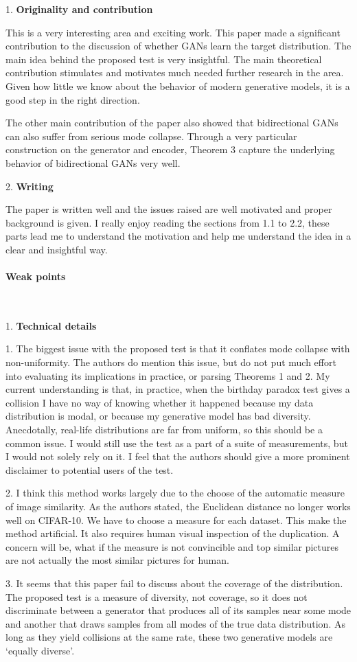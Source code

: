 \documentclass{article}
\begin{document}
1. \textbf{Originality and contribution} 

This is a very interesting area and exciting work. This paper made a significant contribution to the discussion of whether GANs learn the target distribution. The main idea behind the proposed test is very insightful. The main theoretical contribution stimulates and motivates much needed further research in the area. Given how little we know about the behavior of modern generative models, it is a good step in the right direction. 

The other main contribution of the paper also showed that bidirectional GANs can also suffer from serious mode collapse. 
Through a very particular construction on the generator and encoder, Theorem 3 capture the underlying behavior of bidirectional GANs very well.

2. \textbf{Writing} \

The paper is written well and the issues raised are well motivated and proper background is given. I really enjoy reading the sections from 1.1 to 2.2, these parts lead me to understand the motivation and help me understand the idea in a clear and insightful way.

\paragraph{Weak points}  \ 

1. \textbf{Technical details} 

1. The biggest issue with the proposed test is that it conflates mode collapse with non-uniformity. The authors do mention this issue, but do not put much effort into evaluating its implications in practice, or parsing Theorems 1 and 2. My current understanding is that, in practice, when the birthday paradox test gives a collision I have no way of knowing whether it happened because my data distribution is modal, or because my generative model has bad diversity. Anecdotally, real-life distributions are far from uniform, so this should be a common issue. I would still use the test as a part of a suite of measurements, but I would not solely rely on it. I feel that the authors should give a more prominent disclaimer to potential users of the test.

2. I think this method works largely due to the choose of the automatic measure of image similarity. As the authors stated, the Euclidean distance no longer works well on CIFAR-10. We have to choose a measure for each dataset. This make the method artificial. It also requires human visual inspection of the duplication. A concern will be, what if the measure is not convincible and top similar pictures are not actually the most similar pictures for human.  

3. It seems that this paper fail to discuss about the coverage of the distribution. The proposed test is a measure of diversity, not coverage, so it does not discriminate between a generator that produces all of its samples near some mode and another that draws samples from all modes of the true data distribution. As long as they yield collisions at the same rate, these two generative models are ‘equally diverse’.

\newpage



\end{document}
